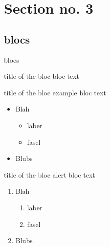 \documentclass{beamer}
\begin{document}
\section{Section no. 3}

\subsection{blocs}

\begin{frame}{blocs}
	\begin{block}{title of the bloc}
		bloc text
	\end{block}

	\begin{exampleblock}{title of the bloc}
		example bloc text
		\begin{itemize}
			\item Blah
			\begin{itemize}
				\item laber
				\item fasel
			\end{itemize}
			\item Blubs
		\end{itemize}
	\end{exampleblock}


	\begin{alertblock}{title of the bloc}
		alert bloc text
		\begin{enumerate}
			\item Blah
			\begin{enumerate}
				\item laber
				\item fasel
			\end{enumerate}
			\item Blubs
		\end{enumerate}
	\end{alertblock}
\end{frame}
\end{document}
